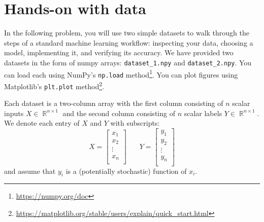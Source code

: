 \documentclass{article}
\newcommand{\Question}[1]{\Large \section{ #1 } \normalsize}
\DeclareMathOperator{\R}{\mathbb{R}}
\begin{document}
\newpage
\Question{Hands-on with data}

In the following problem, you will use two simple datasets to walk through the steps of a standard machine learning workflow: inspecting your data, choosing a model, implementing it, and verifying its accuracy. 
We have provided two datasets in the form of numpy arrays: \texttt{dataset\_1.npy} and \texttt{dataset\_2.npy}. 
You can load each using NumPy's \texttt{np.load} method\footnote{\href{https://numpy.org/doc/}{https://numpy.org/doc}}. 
You can plot figures using Matplotlib's \texttt{plt.plot} method\footnote{\href{https://matplotlib.org/stable/users/explain/quick_start.html}{https://matplotlib.org/stable/users/explain/quick\_start.html}}.

Each dataset is a two-column array with the first column consisting of $n$ scalar inputs $X \in \R^{n \times 1}$ and the second column consisting of $n$ scalar labels $Y \in \R^{n \times 1}$. 
We denote each entry of $X$ and $Y$ with subscripts:
\[
    X = 
    \begin{bmatrix}
        x_1 \\
        x_2 \\
        \vdots \\
        x_n \\
    \end{bmatrix}
    ~~~~~~~~
    Y = 
    \begin{bmatrix}
        y_1 \\
        y_2 \\
        \vdots \\
        y_n \\
    \end{bmatrix}
\]
and assume that $y_i$ is a (potentially stochastic) function of $x_i$.
\end{document}
